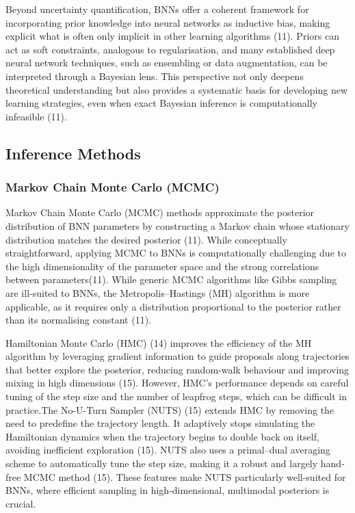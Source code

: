 \documentclass[
  a4paper,
]{scrreprt}
\begin{document}
Beyond uncertainty quantification, BNNs offer a coherent framework for
incorporating prior knowledge into neural networks as inductive bias,
making explicit what is often only implicit in other learning algorithms
(11). Priors can act as soft constraints, analogous to regularisation,
and many established deep neural network techniques, such as ensembling
or data augmentation, can be interpreted through a Bayesian lens. This
perspective not only deepens theoretical understanding but also provides
a systematic basis for developing new learning strategies, even when
exact Bayesian inference is computationally infeasible (11).

\subsection{Inference Methods}\label{inference-methods}

\subsubsection{Markov Chain Monte Carlo
(MCMC)}\label{markov-chain-monte-carlo-mcmc}

Markov Chain Monte Carlo (MCMC) methods approximate the posterior
distribution of BNN parameters by constructing a Markov chain whose
stationary distribution matches the desired posterior (11). While
conceptually straightforward, applying MCMC to BNNs is computationally
challenging due to the high dimensionality of the parameter space and
the strong correlations between parameters(11). While generic MCMC
algorithms like Gibbs sampling are ill-suited to BNNs, the
Metropolis--Hastings (MH) algorithm is more applicable, as it requires
only a distribution proportional to the posterior rather than its
normalising constant (11).

Hamiltonian Monte Carlo (HMC) (14) improves the efficiency of the MH
algorithm by leveraging gradient information to guide proposals along
trajectories that better explore the posterior, reducing random-walk
behaviour and improving mixing in high dimensions (15). However, HMC's
performance depends on careful tuning of the step size and the number of
leapfrog steps, which can be difficult in practice.The No-U-Turn Sampler
(NUTS) (15) extends HMC by removing the need to predefine the trajectory
length. It adaptively stops simulating the Hamiltonian dynamics when the
trajectory begins to double back on itself, avoiding inefficient
exploration (15). NUTS also uses a primal--dual averaging scheme to
automatically tune the step size, making it a robust and largely
hand-free MCMC method (15). These features make NUTS particularly
well-suited for BNNs, where efficient sampling in high-dimensional,
multimodal posteriors is crucial.
\end{document}

